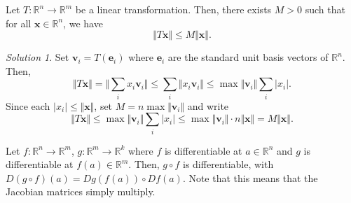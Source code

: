 \documentclass[11pt]{article}
\newcommand{\R}{\mathbb{R}}
\newcommand{\norm}[1]{\Vert #1 \Vert}
\renewcommand{\vec}[1]{\boldsymbol{#1}}
\newcommand{\vx}{\vec{x}}
\newcommand{\vv}{\vec{v}}
\newcommand{\ve}{\vec{e}}
\theoremstyle{definition}
\theoremstyle{remark}
\newtheorem*{solution}{Solution}
\numberwithin{equation}{section}
\begin{document}
    \begin{exercise}
        Let $T\colon \R^n \to \R^m$ be a linear transformation. Then, there exists $M
        > 0$ such that for all $\vx \in \R^n$, we have \[
            \norm{T\vx} \leq M\norm{\vx}.
        \] 
        \begin{solution}
            Set $\vv_i = T(\ve_i)$ where $\ve_i$ are the standard unit basis vectors of
            $\R^n$. Then, \[
                \norm{T\vx} = \norm{\sum_{i}x_i\vv_i} \leq \sum_{i}\norm{x_i\vv_i}
                \leq \max{\norm{\vv_i}} \sum_i |x_i|.
            \] Since each $|x_i| \leq \norm{\vx}$, set $M = n\max{\norm{\vv_i}}$ and
            write \[
                \norm{T\vx} \leq \max{\norm{\vv_i}}\sum_i |x_i| \leq
                \max{\norm{\vv_i}} \cdot n\norm{\vx} = M\norm{\vx}.
            \] 
        \end{solution}
    \end{exercise}
    \begin{theorem}
        Let $f\colon \R^n \to \R^m$, $g\colon \R^m \to \R^k$ where $f$ is
        differentiable at $a \in \R^n$ and $g$ is differentiable at $f(a) \in \R^m$.
        Then, $g\circ f$ is differentiable, with $D(g\circ f)(a) = Dg(f(a)) \circ
        Df(a)$. Note that this means that the Jacobian matrices simply multiply.
    \end{theorem}
\end{document}
